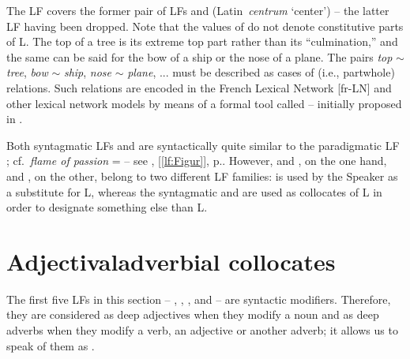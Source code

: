 \begin{historicalremark}
The LF  covers the former pair of LFs  and  ({\smaller Latin}~\textit{centrum} `center') -- the latter LF having been dropped. Note that the values of  do not denote constitutive parts of L. The top of a tree is its extreme top part rather than its ``culmination,'' and the same can be said for the bow of a ship or the nose of a plane. The pairs \textit{top} $\sim$ \textit{tree}, \textit{bow} $\sim$ \textit{ship}, \textit{nose} $\sim$ \textit{plane}, ... must be described as cases of  (i.e., part\slashs{}whole) relations. Such relations are encoded in the French Lexical Network \mbox{[fr-LN]} \parencite{LuxPogodallaPolguere2011} and other lexical network models by means of a formal tool called \label{lf:Mero} -- initially proposed in \parencite[125--127]{Jousse2010}.
\end{historicalremark}

\label{txt:Figur-Germ-Culm}Both syntagmatic LFs  and  are syntactically quite similar to the paradigmatic LF ; cf.~\textit{flame of passion} =  -- see , [\ref{lf:Figur}], p.\thinspace\pageref{lf:Figur}. However,  and , on the one hand, and , on the other, belong to two different LF families:  is used by the Speaker as a substitute for L, whereas the syntagmatic  and  are used as collocates of L in order to designate something else than L.


\section{Adjectival\slashs{}adverbial collocates}\label{sec:collocatifsModif}

The first five LFs in this section -- , , ,  and  -- are syntactic modifiers. Therefore, they are considered as deep adjectives when they modify a noun and as deep adverbs when they modify a verb, an adjective or another adverb; it allows us to speak of them as \slashs{}.

